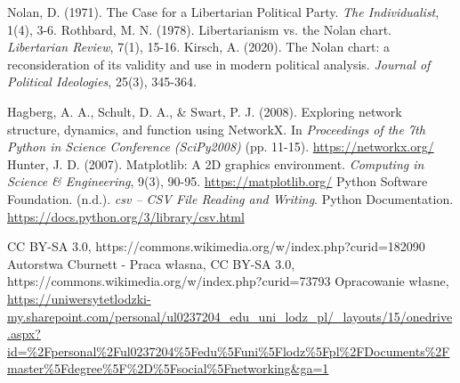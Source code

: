  Nolan, D. (1971). The Case for a Libertarian Political Party. \textit{The Individualist}, 1(4), 3-6.
 Rothbard, M. N. (1978). Libertarianism vs. the Nolan chart. \textit{Libertarian Review}, 7(1), 15-16.
 Kirsch, A. (2020). The Nolan chart: a reconsideration of its validity and use in modern political analysis. \textit{Journal of Political Ideologies}, 25(3), 345-364.

 Hagberg, A. A., Schult, D. A., \& Swart, P. J. (2008). Exploring network structure, dynamics, and function using NetworkX. In \textit{Proceedings of the 7th Python in Science Conference (SciPy2008)} (pp. 11-15). \url{https://networkx.org/}
 Hunter, J. D. (2007). Matplotlib: A 2D graphics environment. \textit{Computing in Science \& Engineering}, 9(3), 90-95. \url{https://matplotlib.org/}
 Python Software Foundation. (n.d.). \textit{csv – CSV File Reading and Writing}. Python Documentation. \url{https://docs.python.org/3/library/csv.html}

 CC BY-SA 3.0, https://commons.wikimedia.org/w/index.php?curid=182090
 Autorstwa Cburnett - Praca własna, CC BY-SA 3.0, \\https://commons.wikimedia.org/w/index.php?curid=73793
 Opracowanie własne, \url{https://uniwersytetlodzki-my.sharepoint.com/personal/ul0237204_edu_uni_lodz_pl/_layouts/15/onedrive.aspx?id=%2Fpersonal%2Ful0237204%5Fedu%5Funi%5Flodz%5Fpl%2FDocuments%2Fmaster%5Fdegree%5F%2D%5Fsocial%5Fnetworking&ga=1}